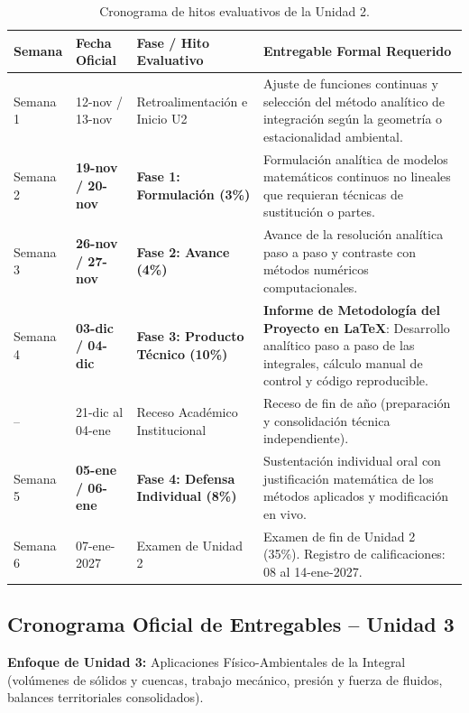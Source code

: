 \documentclass[11pt,a4paper]{article}
\begin{document}
\begin{table}[h!]
\centering
\scriptsize
\renewcommand{\arraystretch}{1.12}
\begin{tabularx}{\textwidth}{C{1.3cm} C{2.4cm} L{3.4cm} Y}
\toprule
\textbf{Semana} & \textbf{Fecha Oficial} & \textbf{Fase / Hito Evaluativo} & \textbf{Entregable Formal Requerido} \\
\midrule
Semana 1 & 12-nov / 13-nov & Retroalimentación e Inicio U2 & Ajuste de funciones continuas y selección del método analítico de integración según la geometría o estacionalidad ambiental. \\
Semana 2 & \textbf{19-nov / 20-nov} & \textbf{Fase 1: Formulación (3\%)} & Formulación analítica de modelos matemáticos continuos no lineales que requieran técnicas de sustitución o partes. \\
Semana 3 & \textbf{26-nov / 27-nov} & \textbf{Fase 2: Avance (4\%)} & Avance de la resolución analítica paso a paso y contraste con métodos numéricos computacionales. \\
Semana 4 & \textbf{03-dic / 04-dic} & \textbf{Fase 3: Producto Técnico (10\%)} & \textbf{Informe de Metodología del Proyecto en \LaTeX{}}: Desarrollo analítico paso a paso de las integrales, cálculo manual de control y código reproducible. \\
-- & 21-dic al 04-ene & Receso Académico Institucional & Receso de fin de año (preparación y consolidación técnica independiente). \\
Semana 5 & \textbf{05-ene / 06-ene} & \textbf{Fase 4: Defensa Individual (8\%)} & Sustentación individual oral con justificación matemática de los métodos aplicados y modificación en vivo. \\
Semana 6 & 07-ene-2027 & Examen de Unidad 2 & Examen de fin de Unidad 2 (35\%). Registro de calificaciones: 08 al 14-ene-2027. \\
\bottomrule
\end{tabularx}
\caption{Cronograma de hitos evaluativos de la Unidad 2.}
\end{table}

\subsection{Cronograma Oficial de Entregables -- Unidad 3}
\textbf{Enfoque de Unidad 3:} Aplicaciones Físico-Ambientales de la Integral (volúmenes de sólidos y cuencas, trabajo mecánico, presión y fuerza de fluidos, balances territoriales consolidados).
\end{document}
